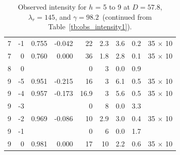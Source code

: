 \begin{table}[htbp]
\begin{tabular}{rrrrrrrrc}
7     & -1    & 0.755 & -0.042 & 22    & 2.3   & 3.6   & 0.2   & 35 $\times$ 10 \\
7     & 0     & 0.760 & 0.000 & 36    & 1.8   & 2.8   & 0.1   & 35 $\times$ 10 \\
8     & 0     &       &       & 0     & 3     & 0.0   & 0.9   &  \\
9     & -5    & 0.951 & -0.215 & 16    & 3     & 6.1   & 0.5   & 35 $\times$ 10 \\
9     & -4    & 0.957 & -0.173 & 16.9  & 3     & 5.6   & 0.5   & 35 $\times$ 10 \\
9     & -3    &       &       & 0     & 8     & 0.0   & 3.3   &  \\
9     & -2    & 0.969 & -0.086 & 10    & 2.9   & 3.0   & 0.4   & 35 $\times$ 10 \\
9     & -1    &       &       & 0     & 6     & 0.0   & 1.7   &  \\
9     & 0     & 0.981 & 0.000 & 17    & 10    & 2.2   & 0.6   & 35 $\times$ 10 \\
    \hline
  \end{tabular}
  \caption{Observed intensity for $h$ = 5 to 9 at $D=57.8$, $\lambda_r=145$, and 
  $\gamma=98.2$\textdegree\ (continued from Table~\ref{tb:obs_intensity1}).}
  \label{tb:obs_intensity2}
\end{table}


